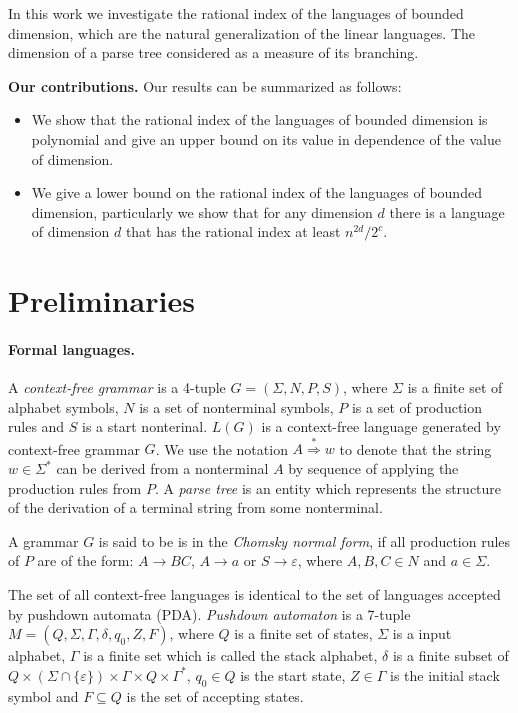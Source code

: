 \documentclass[11pt,a4paper]{article} %
\begin{document}
In this work we investigate the rational index of the languages of bounded dimension, which are the natural generalization of the linear languages. The dimension of a parse tree considered as a measure of its branching. 


\textbf{Our contributions.} Our results can be summarized as follows:
\begin{itemize}
\item We show that the rational index of the languages of bounded dimension is polynomial and give an upper bound on its value in dependence of the value of dimension.
\item We give a lower bound on the rational index of the languages of bounded dimension, particularly we show that for any dimension $d$ there is a language of dimension $d$ that has the rational index at least $n^{2d}/2^c$.

\end{itemize}





\section{Preliminaries}
\label{sec:prel}
\label{preliminaries}
\paragraph{Formal languages.} 
A \textit{context-free grammar} is a 4-tuple $G = (\Sigma, N, P, S)$, where $\Sigma$ is a finite set of alphabet symbols,  $N$ is a set of nonterminal symbols, $P$ is a set of production rules and $S$ is a start nonterinal. $L(G)$ is a context-free language generated by context-free grammar $G$. We use the notation $A \stackrel {*}{\Rightarrow } w$  to denote that the string $w \in \Sigma^*$ can be derived from a nonterminal $A$ by sequence of applying the production rules from $P$. A \textit{parse tree} is an entity which represents the structure of the derivation of a terminal string from some nonterminal.


A grammar $G$ is said to be is in the \textit{Chomsky normal form}, if all production rules of $P$ are of the form:
$A \rightarrow BC$, $A \rightarrow a$ or $S \rightarrow \varepsilon$, where $A, B, C \in N$ and $a \in \Sigma$. 


The set of all context-free languages is identical to the set of languages accepted by pushdown automata (PDA). \textit{Pushdown automaton} is a 7-tuple $M = (Q, \Sigma, \Gamma, \delta, q_0, Z, F)$, where $Q$ is a finite set of states, $\Sigma$ is a input alphabet, $\Gamma$ is a finite set which is called the stack alphabet, $\delta$ is a finite subset of $Q \times (\Sigma \cap \{\varepsilon\}) \times \Gamma \times Q \times \Gamma^*$,
$q_{0}\in Q$ is the start state, $Z \in \Gamma$ is the initial stack symbol and
$F\subseteq Q$ is the set of accepting states.
\end{document}
